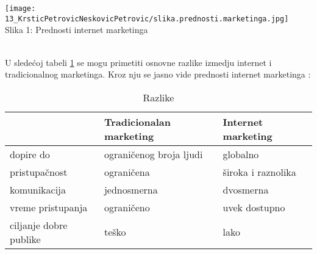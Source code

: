 \documentclass[a4paper]{article}
\begin{document}
{\begin{center}
    \texttt{[image: 13\_KrsticPetrovicNeskovicPetrovic/slika.prednosti.marketinga.jpg]}\\
    \large{Slika 1: Prednosti internet marketinga}
\end{center}
\label{fig:prednosti}

\\U sledećoj tabeli \ref{tab:tabela1}  se mogu primetiti osnovne razlike izmedju internet i tradicionalnog marketinga. Kroz nju se jasno vide prednosti internet marketinga :
\newpage
\begin{table}[h!]
\begin{center}
\caption{Razlike}
\begin{tabular}{|p{2cm}|p{3.1cm}|p{3.1cm}|} \hline
     &\centering Tradicionalan marketing& Internet marketing\\ \hline
 \centering dopire do& ograničenog broja \centering ljudi & globalno\\   \hline
\centering pristupačnost & ograničena& široka i raznolika\\ \hline
\centering komunikacija & jednosmerna& dvosmerna\\\hline
 \centering vreme pristupanja& ograničeno& uvek dostupno \\ \hline
\centering ciljanje dobre  publike &  teško &  lako  \\ \hline
\end{tabular}
\label{tab:tabela1}
\end{center}
\end{table}



}
\end{document}
